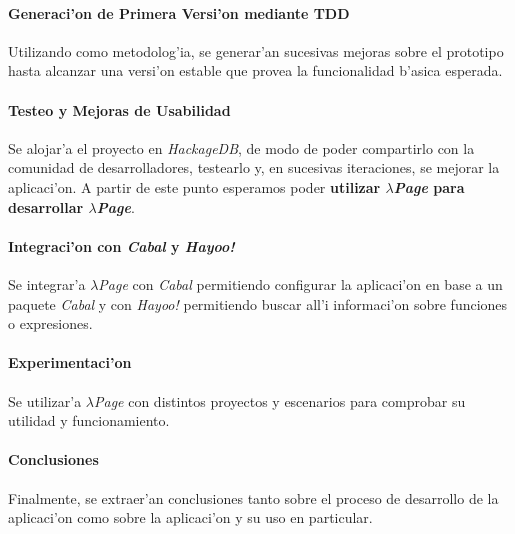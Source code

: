 \documentclass[a4paper]{article}
\begin{document}
\paragraph{Generaci'on de Primera Versi'on mediante TDD} Utilizando  como metodolog'ia, se generar'an sucesivas mejoras sobre el prototipo hasta alcanzar una versi'on estable que provea la funcionalidad b'asica esperada.
\paragraph{Testeo y Mejoras de Usabilidad} Se alojar'a el proyecto en \textsl{HackageDB}, de modo de poder compartirlo con la comunidad de desarrolladores, testearlo y, en sucesivas iteraciones, se mejorar la aplicaci'on.  A partir de este punto esperamos poder \textbf{utilizar \textsl{$\lambda$Page} para desarrollar \textsl{$\lambda$Page}}.
\paragraph{Integraci'on con \textsl{Cabal} y \textsl{Hayoo!}} Se integrar'a \textsl{$\lambda$Page} con \textsl{Cabal} permitiendo configurar la aplicaci'on en base a un paquete \textsl{Cabal} y con \textsl{Hayoo!} permitiendo buscar all'i informaci'on sobre funciones o expresiones.
\paragraph{Experimentaci'on} Se utilizar'a \textsl{$\lambda$Page} con distintos proyectos y escenarios para comprobar su utilidad y funcionamiento.
\paragraph{Conclusiones} Finalmente, se extraer'an conclusiones tanto sobre el proceso de desarrollo de la aplicaci'on como sobre la aplicaci'on y su uso en particular.


\end{document}
